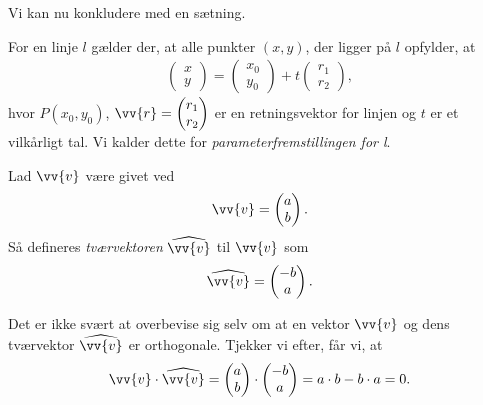 Vi kan nu konkludere med en sætning.
\begin{setn}
For en linje $l$ gælder der, at alle punkter $(x,y)$, der ligger på $l$ opfylder, at
\begin{align*}
\begin{pmatrix}
x \\ y
\end{pmatrix}
=
\begin{pmatrix}
x_0 \\ y_0
\end{pmatrix} 
+
t
\begin{pmatrix}
r_1 \\ r_2
\end{pmatrix},
\end{align*} 
hvor $P(x_0,y_0)$, $\vv{r} = \begin{pmatrix}
r_1 \\ r_2
\end{pmatrix}$
er en retningsvektor for linjen og $t$ er et vilkårligt tal. Vi kalder dette for \textit{parameterfremstillingen for l}.
\end{setn}
\begin{defn}[Tværvektor]
	Lad $\vv{v}$ være givet ved
	\begin{align*}
		\vv{v} = 
		\begin{pmatrix}
			a \\ b
		\end{pmatrix}.
	\end{align*}
	Så defineres \textit{tværvektoren} $\widehat{\vv{v}}$ til $\vv{v}$ som 
	\begin{align*}
		\widehat{\vv{v}} = 
		\begin{pmatrix}
			-b \\ a
		\end{pmatrix}.
	\end{align*}
\end{defn}
Det er ikke svært at overbevise sig selv om at en vektor $\vv{v}$ og dens tværvektor $\widehat{\vv{v}}$ er orthogonale. Tjekker vi efter, får vi, at 
\begin{align*}
	\vv{v} \cdot \widehat{\vv{v}} = 
	\begin{pmatrix}
		a \\ b
	\end{pmatrix} \cdot
	\begin{pmatrix}
		-b \\ a
	\end{pmatrix} = 
	a\cdot b - b\cdot a = 0. 
\end{align*}
